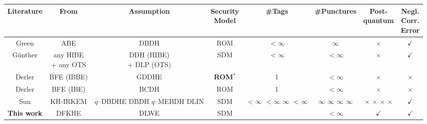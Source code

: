 \documentclass[runningheads,10pt]{llncs}
\begin{document}
\begin{table}[h]
 	\smallskip
 	\small\addtolength{\tabcolsep}{0pt}
 	\begin{tabular}{ c | c| c|c|c|c |c|c}
 	\hline
 		Literature&From& Assumption&\makecell{Security\\ Model} &\#Tags &\#Punctures &\makecell{Post-\\quantum} &\makecell{Negl.\\ Corr. \\Error} \\
 		\hline
 		\hline 
 	Green	\cite{GM15}&ABE& DBDH& ROM &$<\infty$ &$\infty$ & $\times$ &$\checkmark$\\
 		\hline
 	G{\"u}nther 	\cite{GHJ+17} &\makecell{any HIBE \\+ any OTS}&\makecell{DDH (HIBE)\\+ DLP (OTS) }&SDM & $<\infty$ &$<\infty$ &$\times$ &$\checkmark$\\
 		\hline
 			Derler  \cite{DGJ+18-ePrint} &BFE (IBBE)& GDDHE& \textbf{ROM$^*$} &1& $< \infty$&$\times$ &$\times$\\
 		\hline
 		Derler \cite{DJSS18} &BFE (IBE)&BCDH&ROM &1& $<\infty$&$\times$&$\times$\\
 		\hline
 		Sun\cite{SSS+20}  &KH-IRKEM&\makecell{$q$--DBDHE\\DBDH\\ $q$--MEBDH\\ DLIN} &SDM& \makecell{$<\infty$\\$<\infty$\\$\infty$\\$<\infty$}&\makecell{$\infty$\\$\infty$\\$\infty$\\$\infty$} &\makecell{$\times$\\$\times$\\$\times$\\$\times$}&$\checkmark$\\
 		\hline
 		\hline
 		\textbf{This work}&	DFKHE &  DLWE& SDM& \makecell{$< \infty$}&$< \infty$&$\checkmark$ &$\checkmark$\\
 		\hline \hline
 	\end{tabular} 
 	\label{tab2}
 \end{table}
 
\end{document}

